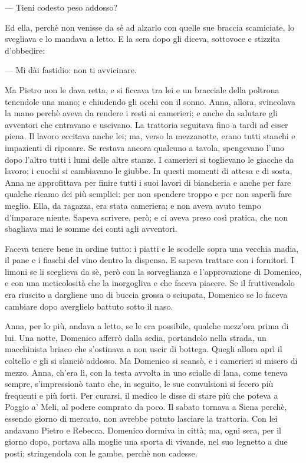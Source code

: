 — Tieni codesto peso addosso?

Ed ella, perchè non venisse da sé ad alzarlo con quelle sue braccia scamiciate, lo svegliava e lo mandava a letto. E la sera dopo gli diceva, sottovoce e stizzita d'obbedire:

— Mi dài fastidio: non ti avvicinare.

Ma Pietro non le dava retta, e si ficcava tra lei e un bracciale della poltrona tenendole una mano; e chiudendo gli occhi con il sonno. Anna, allora, svincolava la mano perchè aveva da rendere i resti ai camerieri; e anche da salutare gli avventori che entravano e uscivano. La trattoria seguitava fino a tardi ad esser piena. Il lavoro eccitava anche lei; ma, verso la mezzanotte, erano tutti stanchi e impazienti di riposare. Se restava ancora qualcuno a tavola, spengevano l'uno dopo l'altro tutti i lumi delle altre stanze. I camerieri si toglievano le giacche da lavoro; i cuochi si cambiavano le giubbe. In questi momenti di attesa e di sosta, Anna ne approfittava per finire tutti i suoi lavori di biancheria e anche per fare qualche ricamo dei più semplici: per non spendere troppo e per non saperli fare meglio. Ella, da ragazza, era stata cameriera; e non aveva avuto tempo d'imparare niente. Sapeva scrivere, però; e ci aveva preso così pratica, che non sbagliava mai le somme dei conti agli avventori.

Faceva tenere bene in ordine tutto: i piatti e le scodelle sopra una vecchia madia, il pane e i fiaschi del vino dentro la dispensa. E sapeva trattare con i fornitori. I limoni se li sceglieva da sè, però con la sorveglianza e l’approvazione di Domenico, e con una meticolosità che la inorgogliva e che faceva piacere. Se il fruttivendolo era riuscito a dargliene uno di buccia grossa o sciupata, Domenico se lo faceva cambiare dopo averglielo battuto sotto il naso.

Anna, per lo più, andava a letto, se le era possibile, qualche mezz’ora prima di lui. Una notte, Domenico afferrò dalla sedia, portandolo nella strada, un macchinista briaco che s’ostinava a non uscir di bottega. Quegli allora aprì il coltello e gli si slanciò addosso. Ma Domenico si scansò, e i camerieri si misero di mezzo. Anna, ch’era lì, con la testa avvolta in uno scialle di lana, come teneva sempre, s’impressionò tanto che, in seguito, le sue convulsioni si fecero più frequenti e più forti. Per curarsi, il medico le disse di stare più che poteva a Poggio a’ Meli, al podere comprato da poco. Il sabato tornava a Siena perchè, essendo giorno di mercato, non avrebbe potuto lasciare la trattoria. Con lei andavano Pietro e Rebecca. Domenico dormiva in città; ma, ogni sera, per il giorno dopo, portava alla moglie una sporta di vivande, nel suo legnetto a due posti; stringendola con le gambe, perchè non cadesse.

